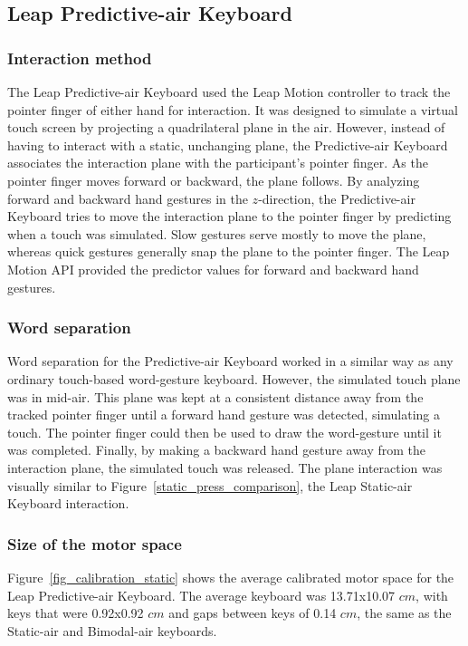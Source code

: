 \subsection{Leap Predictive-air Keyboard} \label{predictive_air_keyboard}
\subsubsection{Interaction method}
The Leap Predictive-air Keyboard used the Leap Motion controller to track the pointer finger of either hand for interaction. It was designed to simulate a virtual touch screen by projecting a quadrilateral plane in the air. However, instead of having to interact with a static, unchanging plane, the Predictive-air Keyboard associates the interaction plane with the participant's pointer finger. As the pointer finger moves forward or backward, the plane follows. By analyzing forward and backward hand gestures in the $z$-direction, the Predictive-air Keyboard tries to move the interaction plane to the pointer finger by predicting when a touch was simulated. Slow gestures serve mostly to move the plane, whereas quick gestures generally snap the plane to the pointer finger. The Leap Motion API provided the predictor values for forward and backward hand gestures.

\subsubsection{Word separation}
Word separation for the Predictive-air Keyboard worked in a similar way as any ordinary touch-based word-gesture keyboard. However, the simulated touch plane was in mid-air. This plane was kept at a consistent distance away from the tracked pointer finger until a forward hand gesture was detected, simulating a touch. The pointer finger could then be used to draw the word-gesture until it was completed. Finally, by making a backward hand gesture away from the interaction plane, the simulated touch was released. The plane interaction was visually similar to Figure~\ref{static_press_comparison}, the Leap Static-air Keyboard interaction.

\subsubsection{Size of the motor space}
Figure~\ref{fig_calibration_static} shows the average calibrated motor space for the Leap Predictive-air Keyboard. The average keyboard was 13.71x10.07 $cm$, with keys that were 0.92x0.92 $cm$ and gaps between keys of 0.14 $cm$, the same as the Static-air and Bimodal-air keyboards.


